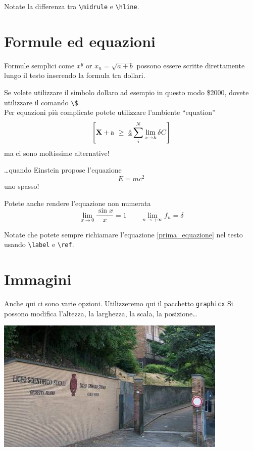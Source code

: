 \documentclass[a4paper,11pt]{article}
\begin{document}
Notate la differenza tra \verb!\midrule! e \verb!\hline!.




\section{Formule ed equazioni}

Formule semplici come $x^y$ or $x_n = \sqrt{a + b}$ possono essere scritte direttamente lungo il testo inserendo la formula tra dollari.

Se volete utilizzare il simbolo dollaro ad esempio in questo modo \$2000,
dovete utilizzare il comando \verb+\$+.
\\

Per equazioni più complicate potete utilizzare l'ambiente  ``equation'' 
\begin{equation}
\label{prima_equazione}
\left[
{\bf X} + {\rm a} \ \geq\ 
\underline{\hat a} \sum_i^N \lim_{x \rightarrow k} \delta C
\right]
\end{equation}
ma ci sono moltissime alternative!

\dots quando Einstein propose l’equazione
\begin{equation}
\label{eqEinstein}
E = mc^2
\end{equation}
uno spasso!

Potete anche rendere l'equazione non numerata
\begin{equation}
    \lim_{x\to 0} \frac{\sin x}{x}=1 \qquad 
    \lim_{n\to +\infty}f_n=\delta
\nonumber %
\end{equation}

Notate che potete sempre richiamare l'equazione \ref{prima_equazione} 
nel testo usando \verb!\label! e \verb!\ref!. 


\section{Immagini}

Anche qui ci sono varie opzioni. Utilizzeremo qui il pacchetto \verb!graphicx!
Si possono modifica l'altezza, la larghezza, la scala, la posizione\dots

\includegraphics[scale=.5]{peano.jpeg}
\end{document}

